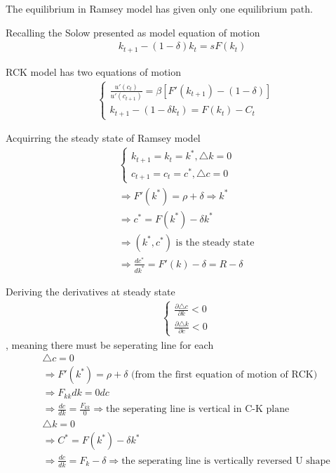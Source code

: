 \documentclass{article}
\begin{document}
The equilibrium in Ramsey model has given only one equilibrium path.


Recalling the Solow presented as model equation of motion \begin{align}
k_{t+1}-(1-\delta)k_{t}=sF(k_{t})
\end{align} 

RCK model has two equations of motion
\begin{align}
&\begin{cases}
\frac{u'(c_{t})}{u'(c_{t+1})}=\beta[F'(k_{t+1})-(1-\delta)] \\
k_{t+1}-(1-\delta k_{t})=F(k_{t})-C_{t}\end{cases}
\end{align}

Acquirring the steady state of Ramsey model
\begin{align}
&
\begin{cases}
 k_{t+1}=k_{t}=k^{*},\triangle k =0 
\\ c_{t+1}=c_{t}=c^{*},\triangle c =0 
\end{cases}
\\&\Rightarrow F'(k^{*})=\rho+\delta \Rightarrow k^{*} 
\\&\Rightarrow c^{*}=F(k^{*})-\delta k^{*} 
\\&\Rightarrow (k^{*},c^{*}) \text{ is the steady state}
\\&\Rightarrow\frac{dc^{*}}{dk^{*}}=F'(k)-\delta=R-\delta
\end{align}

Deriving the derivatives at steady state
\begin{align}
& 
\begin{cases}
\frac{\partial  \triangle c}{\partial  k}<0 \\
\frac{\partial  \triangle k}{\partial  c}<0
\end{cases}
\end{align}
, meaning there must be seperating line for each
\begin{align}
& 
\triangle c =0 
\\&\Rightarrow F'(k^{*})=\rho +\delta \text{ (from the first equation of motion of RCK)}
\\&\Rightarrow F_{kk}dk=0 dc
\\&\Rightarrow \frac{dc}{dk}=\frac{F_{kk}}{0} \Rightarrow \text{the seperating line is vertical in C-K plane}
\\&\triangle k=0
\\&\Rightarrow C^{*}=F(k^{*})-\delta k^{*}
\\&\Rightarrow \frac{dc}{dk}=F_{k}-\delta \Rightarrow \text{the seperating line is vertically reversed U shape}
\end{align}
\end{document}
